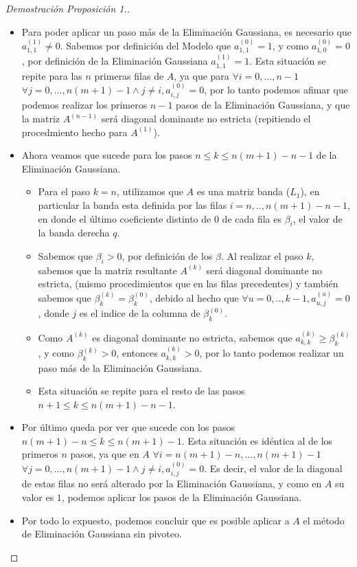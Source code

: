 \begin{proof}[Demostración Proposición 1.]
\begin{itemize}
\item Para poder aplicar un paso más de la Eliminación Gaussiana, es necesario que $a^{(1)}_{1,1} \neq 0$. Sabemos por definición del Modelo que $a^{(0)}_{1,1} = 1$, y como $a^{(0)}_{1,0} = 0$, por definición de la Eliminación Gaussiana $a^{(1)}_{1,1} = 1$. Esta situación se repite para las $n$ primeras filas de $A$, ya que para $\forall i=0,...,n-1$ $\forall j=0,...,n(m+1)-1 \land j \neq i, a^{(0)}_{i,j} = 0$, por lo tanto podemos afimar que podemos realizar los primeros $n-1$ pasos de la Eliminación Gaussiana, y que la matriz $A^{(n-1)}$ será diagonal dominante no estricta (repitiendo el procedmiento hecho para $A^{(1)}$).

\item Ahora veamos que sucede para los pasos $n \leq k \leq n(m+1)-n-1$ de la Eliminación Gaussiana.
  \begin{itemize}
      \item Para el paso $k=n$, utilizamos que $A$ es una matriz banda ($L_{1}$), en particular la banda esta definida por las filas $i=n,..,n(m+1)-n-1$, en donde el último coeficiente distinto de 0 de cada fila es $\beta_{i}$, el valor de la banda derecha $q$.
      \item Sabemos que $\beta_{i} > 0$, por definición de los $\beta$. Al realizar el paso $k$, sabemos que la matriz resultante $A^{(k)}$ será diagonal dominante no estricta, (mismo procedimientos que en las filas precedentes) y también sabemos que $\beta^{(k)}_{k} = \beta^{(0)}_{k}$, debido al hecho que $\forall u=0,..,k-1, a^{(u)}_{u,j} = 0$, donde $j$ es el indice de la columna de $\beta^{(0)}_{k}$.
      \item Como $A^{(k)}$ es diagonal dominante no estricta, sabemos que $a^{(k)}_{k,k} \geq \beta^{(k)}_{k}$, y como $\beta^{(k)}_{k} > 0$, entonces $a^{(k)}_{k,k} > 0$, por lo tanto podemos realizar un paso más de la Eliminación Gaussiana.
      \item Esta situación se repite para el resto de las pasos $n+1 \leq k \leq n(m+1)-n-1$.
  \end{itemize}
\item Por último queda por ver que sucede con los pasos $ n(m+1)-n \leq k \leq n(m+1)-1$. Esta situación es idéntica al de los primeros $n$ pasos, ya que en $A$  $\forall i=n(m+1)-n,...,n(m+1)-1$ $\forall j=0,...,n(m+1)-1 \land j \neq i, a^{(0)}_{i,j} = 0$. Es decir, el valor de la diagonal de estas filas no será alterado por la Eliminación Gaussiana, y como en $A$ su valor es $1$, podemos aplicar los pasos de la Eliminación Gaussiana.

\item Por todo lo expuesto, podemos concluir que es posible aplicar a $A$ el método de Eliminación Gaussiana sin pivoteo.

\end{itemize}

\end{proof}
